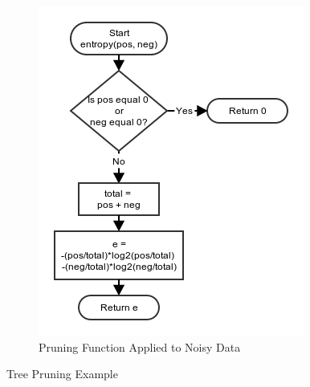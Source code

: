 \documentclass[11pt,a4paper]{article}
\begin{document}
\begin{figure}[!ht]
\begin{subfigure}[b]{0.495\textwidth}
		\includegraphics[width=\textwidth]{images/flow_chart/entropy.png}
     	\caption{Pruning Function Applied to Noisy Data}
     	\label{fig:pruningNoisy}
    \end{subfigure}
    \caption{Tree Pruning Example}
    \label{fig:pruning}
\end{figure}
\end{document}
